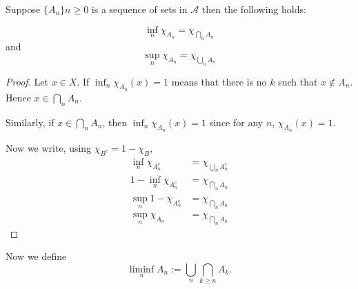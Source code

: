 \documentclass{unswmaths}
\begin{document}
    Suppose $\{A_{n}\}{n\geq 0}$ is a sequence of sets in $\mathcal{A}$ then 
    the following holds:
    \begin{lemma}
    \label{charSup}
        \begin{equation*}
            \inf_{n} \chi_{A_n} = \chi_{\bigcap_n A_n}
        \end{equation*}
        and
        \begin{equation*}
            \sup_{n} \chi_{A_n} = \chi_{\bigcup_n A_n}
        \end{equation*}
    \end{lemma}
    \begin{proof}
        Let $x \in X$. If $\inf_n \chi_{A_n}(x) = 1$ means that
        there is no $k$ such that $x \notin A_n$. Hence $x \in \bigcap_{n} A_n$.
        
        Similarly, if $x \in \bigcap_{n} A_n$, then $\inf_n \chi_{A_n}(x) = 1$
        since for any $n$, $\chi_{A_n}(x) = 1$.
        
        Now we write, using $\chi_{B^c} = 1-\chi_B$,
        \begin{align*}
            \inf_n \chi_{A_n^c} &= \chi_{\bigcup_n A_n^c}\\
            1-\inf_n\chi_{A_n^c} &= \chi_{\bigcap_n A_n}\\
            \sup_n 1-\chi_{A_n^c} &=  \chi_{\bigcap_n A_n}\\
            \sup_n \chi_{A_n} &= \chi_{\bigcap_n A_n}
        \end{align*}
    \end{proof}
    
    Now we define
    \begin{equation*}
        \liminf_n A_n := \bigcup_n \bigcap_{k\geq n} A_k.
    \end{equation*}
    
\end{document}
